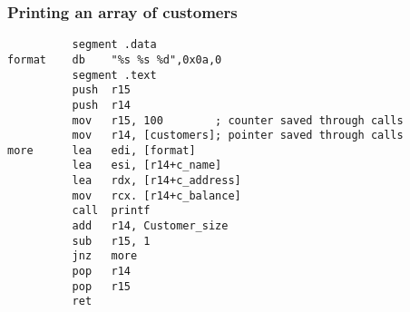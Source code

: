 \documentclass{beamer}
\begin{document}
\begin{frame}[fragile]
    \frametitle{Printing an array of customers}
\small
\begin{verbatim}
          segment .data
format    db    "%s %s %d",0x0a,0
          segment .text
          push  r15
          push  r14
          mov   r15, 100        ; counter saved through calls
          mov   r14, [customers]; pointer saved through calls
more      lea   edi, [format]
          lea   esi, [r14+c_name]
          lea   rdx, [r14+c_address]
          mov   rcx. [r14+c_balance]
          call  printf
          add   r14, Customer_size
          sub   r15, 1
          jnz   more
          pop   r14
          pop   r15
          ret
\end{verbatim}
\end{frame}
\end{document}

